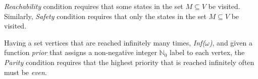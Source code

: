 
\textit{Reachability} condition requires that some states in the set $M \subseteq V$ be visited. Similarly, \textit{Safety} condition requires that only the states in the set $M \subseteq V$ be visited.



Having a set vertices that are reached infinitely many times, \textit{Inf($\omega$)}, and given a function \textit{prior} that assigns a non-negative integer $\mathbb{N}_0$ label to each vertex, the \textit{Parity} condition requires that the highest priority that is reached infinitely often must be \textit{even}.